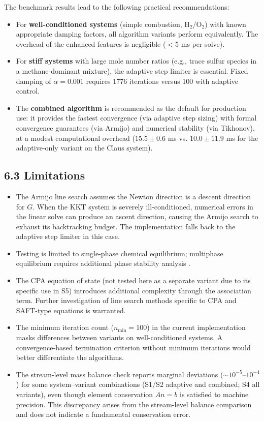 \documentclass[review,3p]{elsarticle}
\begin{document}
The benchmark results lead to the following practical recommendations:

\begin{itemize}
  \item For \textbf{well-conditioned systems} (simple combustion, H$_2$/O$_2$) with known appropriate damping factors, all algorithm variants perform equivalently. The overhead of the enhanced features is negligible ($<$5 ms per solve).
  \item For \textbf{stiff systems} with large mole number ratios (e.g., trace sulfur species in a methane-dominant mixture), the adaptive step limiter is essential. Fixed damping of $\alpha = 0.001$ requires 1776 iterations versus 100 with adaptive control.
  \item The \textbf{combined algorithm} is recommended as the default for production use: it provides the fastest convergence (via adaptive step sizing) with formal convergence guarantees (via Armijo) and numerical stability (via Tikhonov), at a modest computational overhead ($15.5 \pm 0.6$ ms vs. $10.0 \pm 11.9$ ms for the adaptive-only variant on the Claus system).
\end{itemize}

\subsection{6.3 Limitations}

\begin{itemize}
  \item The Armijo line search assumes the Newton direction is a descent direction for $G$. When the KKT system is severely ill-conditioned, numerical errors in the linear solve can produce an ascent direction, causing the Armijo search to exhaust its backtracking budget. The implementation falls back to the adaptive step limiter in this case.
  \item Testing is limited to single-phase chemical equilibrium; multiphase equilibrium requires additional phase stability analysis \citep{Michelsen2007}.
  \item The CPA equation of state (not tested here as a separate variant due to its specific use in S5) introduces additional complexity through the association term. Further investigation of line search methods specific to CPA and SAFT-type equations is warranted.
  \item The minimum iteration count ($n_{\min} = 100$) in the current implementation masks differences between variants on well-conditioned systems. A convergence-based termination criterion without minimum iterations would better differentiate the algorithms.
  \item The stream-level mass balance check reports marginal deviations ($\sim 10^{-5}$–$10^{-4}$) for some system–variant combinations (S1/S2 adaptive and combined; S4 all variants), even though element conservation $An = b$ is satisfied to machine precision. This discrepancy arises from the stream-level balance comparison and does not indicate a fundamental conservation error.
\end{itemize}
\end{document}
